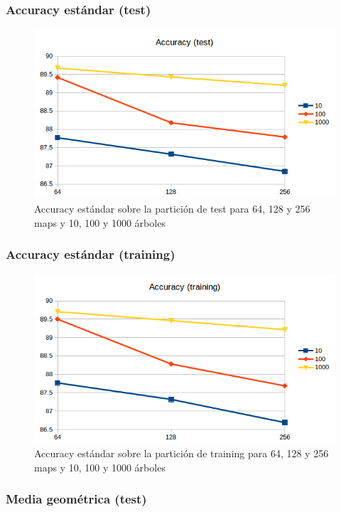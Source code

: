 \subsubsection{Accuracy estándar (test)}

\begin{figure}[H]
	\centering
	\includegraphics[width=12cm]{img/accuracy-test}
	\caption{Accuracy estándar sobre la partición de test para 64, 128 y 256 maps y 10, 100 y 1000 árboles}
	\label{fig:accuracy-test}
\end{figure}

\subsubsection{Accuracy estándar (training)}

\begin{figure}[H]
	\centering
	\includegraphics[width=12cm]{img/accuracy-training}
	\caption{Accuracy estándar sobre la partición de training para 64, 128 y 256 maps y 10, 100 y 1000 árboles}
	\label{fig:accuracy-training}
\end{figure}

\subsubsection{Media geométrica (test)}

